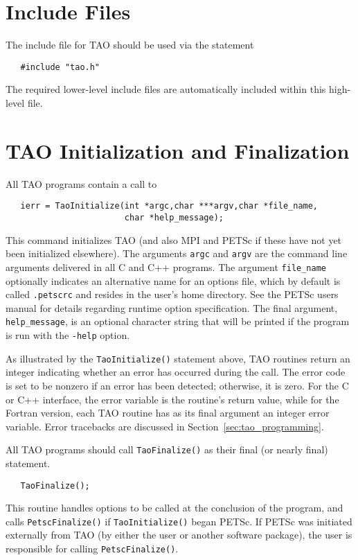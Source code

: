 \section{Include Files}

The include file for TAO should be used via the statement
\begin{verbatim}
   #include "tao.h"
\end{verbatim}
\noindent
The required lower-level include files are automatically included
within this high-level file.

\section{TAO Initialization and Finalization}
\label{sec:initialization}

All TAO programs contain a call to 
\begin{verbatim}
   ierr = TaoInitialize(int *argc,char ***argv,char *file_name, 
                        char *help_message);
\end{verbatim}
\noindent 
This command initializes TAO (and also MPI and PETSc if these have not
yet been initialized elsewhere).  The arguments \texttt{argc} and
\texttt{argv} are the command line arguments delivered in all C and
C++ programs.  The argument
\texttt{file\_name} optionally indicates an alternative name for an
options file, which by default is called \texttt{.petscrc} and resides
in the user's home directory.  See the PETSc users manual 
\cite{petsc-user-ref} for details
regarding runtime option specification.  The final argument,
\texttt{help\_message}, is an optional character string that will be
printed if the program is run with the \texttt{-help} option.

As illustrated by the \texttt{TaoInitialize()} statement above, TAO
routines return an integer indicating whether an error has occurred
during the call.  The error code is set to be nonzero if an error has
been detected; otherwise, it is zero.  For the C or C++ interface, the
error variable is the routine's return value, while for the Fortran
version, each TAO routine has as its final argument an integer error
variable.  Error tracebacks are discussed in
Section~\ref{sec:tao_programming}.


All TAO programs should call \texttt{TaoFinalize()}
 as their final (or nearly final) statement.
\begin{verbatim}
   TaoFinalize();
\end{verbatim}
\noindent
This routine handles options to be called at the conclusion of the
program, and calls \texttt{PetscFinalize()} %
if \texttt{TaoInitialize()} began PETSc. If PETSc was initiated
externally from TAO (by either the user or another software package),
the user is responsible for calling \texttt{PetscFinalize()}.

